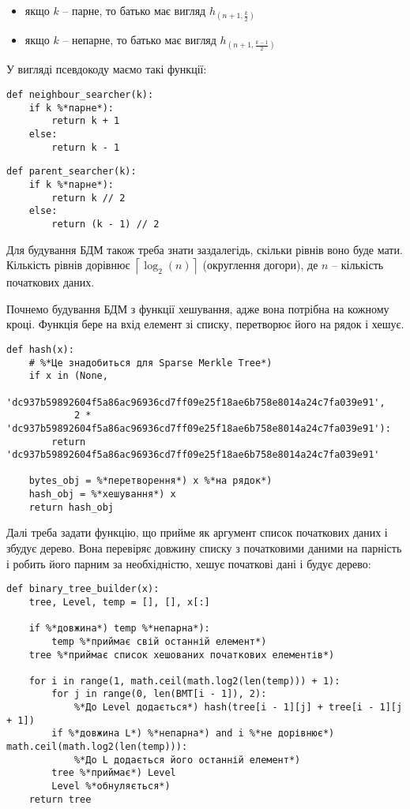 \documentclass[a4paper, 12pt]{article}
\begin{document}
\begin{itemize}
	\item якщо $k$ -- парне, то батько має вигляд $h_{(n+1, \frac k2)}$
	\item якщо $k$ -- непарне, то батько має вигляд $h_{(n+1, \frac {k-1}2)}$
\end{itemize}
 
\par У вигляді псевдокоду маємо такі функції:

\begin{lstlisting}
def neighbour_searcher(k):
	if k %*парне*):
		return k + 1
	else:
		return k - 1
\end{lstlisting}

\begin{lstlisting}
def parent_searcher(k):
    if k %*парне*):
        return k // 2
    else:
        return (k - 1) // 2
\end{lstlisting}
 
\par Для будування БДМ також треба знати заздалегідь, скільки рівнів воно буде мати. Кількість рівнів дорівнює $\left\lceil \log_2(n) \right\rceil$ (округлення догори), де $n$ -- кількість початкових даних.
\newpage

\par Почнемо будування БДМ з функції хешування, адже вона потрібна на кожному кроці. Функція бере на вхід елемент зі списку, перетворює його на рядок і хешує.
 
\begin{lstlisting}
def hash(x):
	# %*Це знадобиться для Sparse Merkle Tree*)
	if x in (None,
		    'dc937b59892604f5a86ac96936cd7ff09e25f18ae6b758e8014a24c7fa039e91',
		    2 * 'dc937b59892604f5a86ac96936cd7ff09e25f18ae6b758e8014a24c7fa039e91'):
		return 'dc937b59892604f5a86ac96936cd7ff09e25f18ae6b758e8014a24c7fa039e91'
		
 	bytes_obj = %*перетворення*) x %*на рядок*)
 	hash_obj = %*хешування*) x
 	return hash_obj
\end{lstlisting}
 
\par Далі треба задати функцію, що прийме як аргумент список початкових даних і збудує дерево. Вона перевіряє довжину списку з початковими даними на парність і робить його парним за необхідністю, хешує початкові дані і будує дерево:
 
\begin{lstlisting}
def binary_tree_builder(x):
    tree, Level, temp = [], [], x[:]

    if %*довжина*) temp %*непарна*):
        temp %*приймає свій останній елемент*)
    tree %*приймає список хешованих початкових елементів*)

    for i in range(1, math.ceil(math.log2(len(temp))) + 1):
        for j in range(0, len(BMT[i - 1]), 2):
            %*До Level додається*) hash(tree[i - 1][j] + tree[i - 1][j + 1])
        if %*довжина L*) %*непарна*) and i %*не дорівнює*) math.ceil(math.log2(len(temp))):
            %*До L додається його останній елемент*)
        tree %*приймає*) Level
        Level %*обнуляється*)
    return tree
\end{lstlisting}
 
\end{document}
